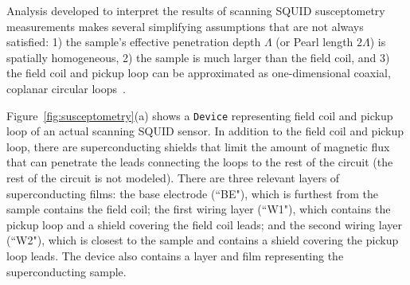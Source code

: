 \documentclass[final,3p,times]{elsarticle}
\newcommand{\inline}[1]{\texttt{#1}\xspace}
\begin{document}
Analysis developed to interpret the results of scanning SQUID susceptometry measurements makes several simplifying assumptions that are not always satisfied: 1) the sample's effective penetration depth $\Lambda$ (or Pearl length $2\Lambda$) is spatially homogeneous, 2) the sample is much larger than the field coil, and 3) the field coil and pickup loop can be approximated as one-dimensional coaxial, coplanar circular loops~\cite{Kirtley_Kalisky_2012}.


Figure~\ref{fig:susceptometry}(a) shows a \inline{Device} representing field coil and pickup loop of an actual scanning SQUID sensor. In addition to the field coil and pickup loop, there are superconducting shields that limit the amount of magnetic flux that can penetrate the leads connecting the loops to the rest of the circuit (the rest of the circuit is not modeled). There are three relevant layers of superconducting films: the base electrode (``BE"), which is furthest from the sample contains the field coil; the first wiring layer (``W1"), which contains the pickup loop and a shield covering the field coil leads; and the second wiring layer (``W2"), which is closest to the sample and contains a shield covering the pickup loop leads. The device also contains a layer and film representing the superconducting sample.
\end{document}
